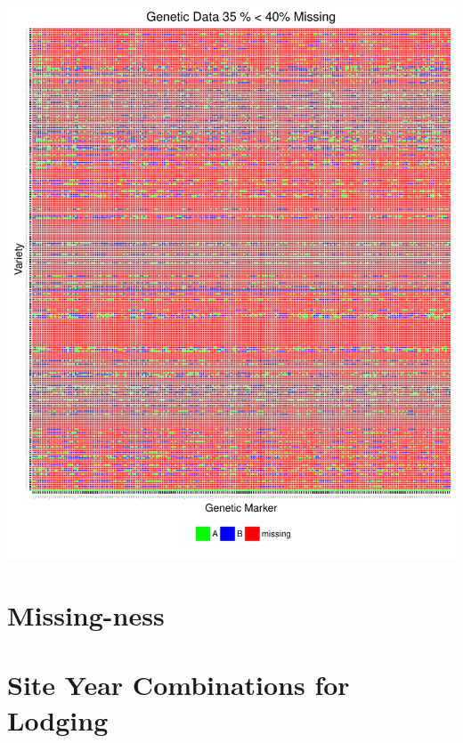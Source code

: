 \documentclass[11pt]{article}\usepackage[]{graphicx}\usepackage[]{color}
\makeatletter
\def\maxwidth{ %
  \ifdim\Gin@nat@width>\linewidth
    \linewidth
  \else
    \Gin@nat@width
  \fi
}
\newenvironment{knitrout}{}{} %
\makeatother
\begin{document}
\begin{knitrout}\footnotesize
{}\color{fgcolor}

{\centering \includegraphics[width=\maxwidth]{figure/missing_plot40-1} 

}



\end{knitrout}







\section{Missing-ness}




\section{Site Year Combinations for Lodging}
\end{document}
